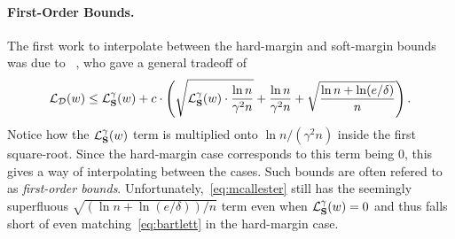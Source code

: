 \paragraph{First-Order Bounds.} 
The first work to interpolate between the hard-margin and soft-margin bounds was due to ~\cite{DBLP:conf/colt/McAllester03}, who gave a general tradeoff of
\begin{align}
    \mathcal{L}_{\mathcal{D}}(w) \leq \mathcal{L}_{\mathbf{S}}^\gamma(w) + c \cdot \left(\sqrt{ \mathcal{L}_{\mathbf{S}}^\gamma(w) \cdot \frac{\ln n}{\gamma^2 n} }  + \frac{\ln n}{\gamma^2 n} + \sqrt{\frac{\ln n + \ln(e/\delta)}{n}}\right).\label{eq:mcallester}
\end{align}
Notice how the $\mathcal{L}_{\mathbf{S}}^\gamma(w)$ term is multiplied onto $\ln n/(\gamma^2 n)$ inside the first square-root. Since the hard-margin case corresponds to this term being $0$, this gives a way of interpolating between the cases. Such bounds are often refered to as \emph{first-order bounds}. Unfortunately,~\eqref{eq:mcallester} still has the seemingly superfluous $\sqrt{(\ln n + \ln(e/\delta))/n}$ term even when $\mathcal{L}_{\mathbf{S}}^\gamma(w)=0$ and thus falls short of even matching~\eqref{eq:bartlett} in the hard-margin case.

